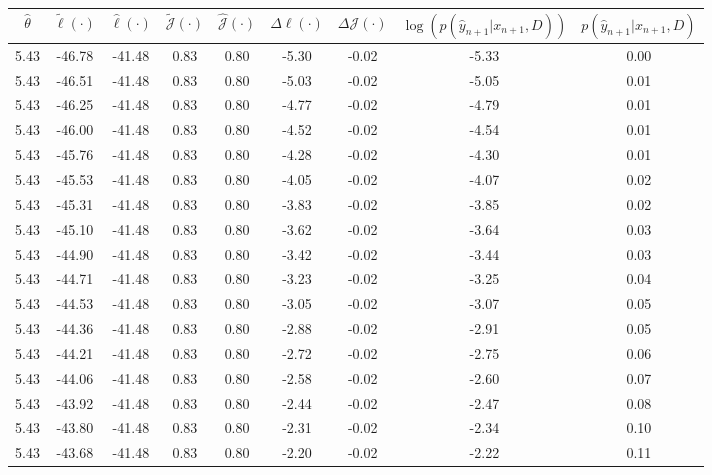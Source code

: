 \begin{table}[htbp]
        \centering
        \tiny
        \begin{adjustbox}{angle=90}
            \begin{tabular}{|c|c|c|c|c|c|c|c|c|}
                \hline
                 $\hat{\theta}$ & $\tilde{\ell}(\cdot)$ & $\hat{\ell}(\cdot)$ & $\tilde{\mathcal{J}}(\cdot)$ & $\hat{\mathcal{J}}(\cdot)$ & $\Delta \ell(\cdot)$ & $\Delta \mathcal{J}(\cdot)$ & $\log(p(\hat{y}_{n+1}|x_{n+1}, D))$ & $p(\hat{y}_{n+1}|x_{n+1}, D)$ \\
                \hline
                 5.43 & -46.78 & -41.48 & 0.83 & 0.80 & -5.30 & -0.02 & -5.33 & 0.00\\ \hline
 5.43 & -46.51 & -41.48 & 0.83 & 0.80 & -5.03 & -0.02 & -5.05 & 0.01\\ \hline
 5.43 & -46.25 & -41.48 & 0.83 & 0.80 & -4.77 & -0.02 & -4.79 & 0.01\\ \hline
 5.43 & -46.00 & -41.48 & 0.83 & 0.80 & -4.52 & -0.02 & -4.54 & 0.01\\ \hline
 5.43 & -45.76 & -41.48 & 0.83 & 0.80 & -4.28 & -0.02 & -4.30 & 0.01\\ \hline
 5.43 & -45.53 & -41.48 & 0.83 & 0.80 & -4.05 & -0.02 & -4.07 & 0.02\\ \hline
 5.43 & -45.31 & -41.48 & 0.83 & 0.80 & -3.83 & -0.02 & -3.85 & 0.02\\ \hline
 5.43 & -45.10 & -41.48 & 0.83 & 0.80 & -3.62 & -0.02 & -3.64 & 0.03\\ \hline
 5.43 & -44.90 & -41.48 & 0.83 & 0.80 & -3.42 & -0.02 & -3.44 & 0.03\\ \hline
 5.43 & -44.71 & -41.48 & 0.83 & 0.80 & -3.23 & -0.02 & -3.25 & 0.04\\ \hline
 5.43 & -44.53 & -41.48 & 0.83 & 0.80 & -3.05 & -0.02 & -3.07 & 0.05\\ \hline
 5.43 & -44.36 & -41.48 & 0.83 & 0.80 & -2.88 & -0.02 & -2.91 & 0.05\\ \hline
 5.43 & -44.21 & -41.48 & 0.83 & 0.80 & -2.72 & -0.02 & -2.75 & 0.06\\ \hline
 5.43 & -44.06 & -41.48 & 0.83 & 0.80 & -2.58 & -0.02 & -2.60 & 0.07\\ \hline
 5.43 & -43.92 & -41.48 & 0.83 & 0.80 & -2.44 & -0.02 & -2.47 & 0.08\\ \hline
 5.43 & -43.80 & -41.48 & 0.83 & 0.80 & -2.31 & -0.02 & -2.34 & 0.10\\ \hline
 5.43 & -43.68 & -41.48 & 0.83 & 0.80 & -2.20 & -0.02 & -2.22 & 0.11\\ \hline

\end{tabular}
\end{adjustbox}
\end{table}
